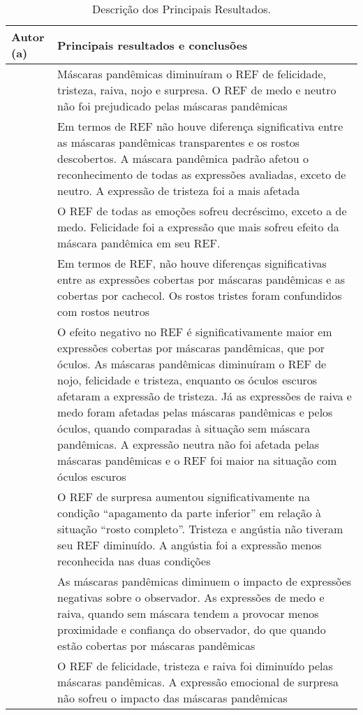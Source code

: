 \documentclass[portuguese]{textolivre}
\begin{document}
\begin{longtable}{p{3cm} p{13.7cm}}
\caption{Descrição dos Principais Resultados.}\label{tbl-02}\\
\toprule
Autor (a) & Principais resultados e conclusões \\
\midrule
\endhead
\textcite{carbon_wearing_2020}{}	&	Máscaras pandêmicas diminuíram o REF de felicidade, tristeza, raiva, nojo e surpresa. O REF de medo e neutro não foi prejudicado pelas máscaras pandêmicas 	\\
\textcite{marini_impact_2021}	&	Em termos de REF não houve diferença significativa entre as máscaras pandêmicas transparentes e os rostos descobertos. A máscara pandêmica padrão afetou o reconhecimento de todas as expressões avaliadas, exceto de neutro. A expressão de tristeza foi a mais afetada	\\
\textcite{bani_behind_2021}	&	O REF de todas as emoções sofreu decréscimo, exceto a de medo. Felicidade foi a expressão que mais sofreu efeito da máscara pandêmica em seu REF.	\\
\textcite{calbi_consequences_2021}	&	Em termos de REF, não houve diferenças significativas entre as expressões cobertas por máscaras pandêmicas e as cobertas por cachecol. Os rostos tristes foram confundidos com rostos neutros	\\
\textcite{noyes_effect_2021}	&	O efeito negativo no REF é significativamente maior em expressões cobertas por máscaras pandêmicas, que por óculos. As máscaras pandêmicas diminuíram o REF de nojo, felicidade e tristeza, enquanto os óculos escuros afetaram a expressão de tristeza. Já as expressões de raiva e medo foram afetadas pelas máscaras pandêmicas e pelos óculos, quando comparadas à situação sem máscara pandêmicas. A expressão neutra não foi afetada pelas máscaras pandêmicas e o REF foi maior na situação com óculos escuros	\\
\textcite{ramachandra_unmasking_2022}	&	O REF de surpresa aumentou significativamente na condição “apagamento da parte inferior” em relação à situação “rosto completo”. Tristeza e angústia não tiveram seu REF diminuído. A angústia foi a expressão menos reconhecida nas duas condições	\\
\textcite{grundmann_face_2020}	&	As máscaras pandêmicas diminuem o impacto de expressões negativas sobre o observador. As expressões de medo e raiva, quando sem máscara tendem a provocar menos proximidade e confiança do observador, do que quando estão cobertas por máscaras pandêmicas	\\
\textcite{parada-fernandez_wearing_2022} 	&	 	O REF de felicidade, tristeza e raiva foi diminuído pelas máscaras pandêmicas. A expressão emocional de surpresa não sofreu o impacto das máscaras pandêmicas	\\

\end{longtable}
\end{document}
